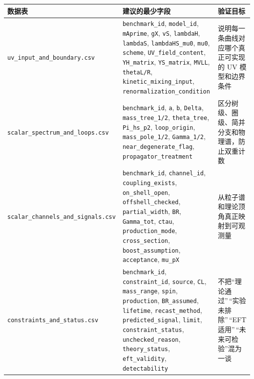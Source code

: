\documentclass[
  chinese,
  UTF8]{ctexart}
\newcounter{none} %
\begin{document}
{\def\LTcaptype{none} %
\begin{longtable}[]{@{}
  >{\raggedright\arraybackslash}p{}
  >{\raggedright\arraybackslash}p{}
  >{\raggedright\arraybackslash}p{}@{}}
\toprule\noalign{}
\begin{minipage}[b]{\linewidth}\raggedright
数据表
\end{minipage} & \begin{minipage}[b]{\linewidth}\raggedright
建议的最少字段
\end{minipage} & \begin{minipage}[b]{\linewidth}\raggedright
验证目标
\end{minipage} \\
\midrule\noalign{}
\endhead
\bottomrule\noalign{}
\endlastfoot
\texttt{uv\_input\_and\_boundary.csv} & \texttt{benchmark\_id},
\texttt{model\_id}, \texttt{mAprime}, \texttt{gX}, \texttt{vS},
\texttt{lambdaH}, \texttt{lambdaS}, \texttt{lambdaHS\_mu0},
\texttt{mu0}, \texttt{scheme}, \texttt{UV\_field\_content},
\texttt{YH\_matrix}, \texttt{YS\_matrix}, \texttt{MVLL},
\texttt{thetaL/R}, \texttt{kinetic\_mixing\_input},
\texttt{renormalization\_condition} & 说明每一条曲线对应哪个真正可实现的
UV 模型和边界条件 \\
\texttt{scalar\_spectrum\_and\_loops.csv} & \texttt{benchmark\_id},
\texttt{a}, \texttt{b}, \texttt{Delta}, \texttt{mass\_tree\_1/2},
\texttt{theta\_tree}, \texttt{Pi\_hs\_p2}, \texttt{loop\_origin},
\texttt{mass\_pole\_1/2}, \texttt{Gamma\_1/2},
\texttt{near\_degenerate\_flag}, \texttt{propagator\_treatment} &
区分树级、圈级、简并分支和物理谱，防止双重计数 \\
\texttt{scalar\_channels\_and\_signals.csv} & \texttt{benchmark\_id},
\texttt{channel\_id}, \texttt{coupling\_exists},
\texttt{on\_shell\_open}, \texttt{offshell\_checked},
\texttt{partial\_width}, \texttt{BR}, \texttt{Gamma\_tot},
\texttt{ctau}, \texttt{production\_mode}, \texttt{cross\_section},
\texttt{boost\_assumption}, \texttt{acceptance}, \texttt{mu\_pX} &
从粒子谱和理论顶角真正映射到可观测量 \\
\texttt{constraints\_and\_status.csv} & \texttt{benchmark\_id},
\texttt{constraint\_id}, \texttt{source}, \texttt{CL},
\texttt{mass\_range}, \texttt{spin}, \texttt{production},
\texttt{BR\_assumed}, \texttt{lifetime}, \texttt{recast\_method},
\texttt{predicted\_signal}, \texttt{limit}, \texttt{constraint\_status},
\texttt{unchecked\_reason}, \texttt{theory\_status},
\texttt{eft\_validity}, \texttt{detectability} &
不把``理论通过''\,``实验未排除''\,``EFT
适用''\,``未来可检验''混为一谈 \\
\end{longtable}
}
\end{document}
